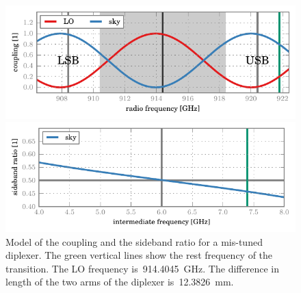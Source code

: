 \begin{figure}
    \centering
    \includegraphics{diplexer_coupling_0503}
    \caption*{
        Coupling of the mixer by the LO and the sky for a mis-tuned diplexer.
        In this specific case, the coupling is shifted \SI{53}{\mega\hertz} to the left of its optimal position.
    }
    \bigskip
    \includegraphics{diplexer_sbr_0503}
    \caption*{
        Sideband ratio of the mixer--sky coupling for a mis-tuned diplexer.
        The left part of the spectrum is USB-dominated, the right part is LSB-dominated.
        The intensity of the  line is underestimated by about~\SI{10}{\percent}.
    }
    \caption{
    Model of the coupling and the sideband ratio for a mis-tuned diplexer.
    The green vertical lines show the rest frequency of the  transition.
    The LO frequency is~\SI{914.4045}{\giga\hertz}.
    The difference in length of the two arms of the diplexer is~\SI{12.3826}{\milli\meter}.
    }
    \label{fig:diplexer_0503}
\end{figure}

